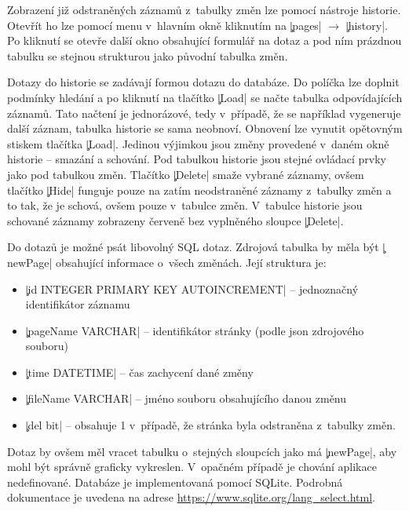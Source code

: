 Zobrazení již odstraněných záznamů z~tabulky změn lze pomocí nástroje historie.
Otevřít ho lze pomocí menu v~hlavním okně kliknutím na \c|pages| $\rightarrow$ \c|history|.
Po kliknutí se otevře další okno obsahující formulář na dotaz a pod ním prázdnou tabulku se stejnou strukturou jako původní tabulka změn.

Dotazy do historie se zadávají formou dotazu do databáze. 
Do políčka lze doplnit podmínky hledání a po kliknutí na tlačítko \c|Load| se načte tabulka odpovídajících záznamů. 
Tato načtení je jednorázové, tedy v~případě, že se například vygeneruje další záznam, tabulka historie se sama neobnoví.
Obnovení lze vynutit opětovným stiskem tlačítka \c|Load|.
Jedinou výjimkou jsou změny provedené v~daném okně historie -- smazání a schování.
Pod tabulkou historie jsou stejné ovládací prvky jako pod tabulkou změn.
Tlačítko \c|Delete| smaže vybrané záznamy, ovšem tlačítko \c|Hide| funguje pouze na zatím neodstraněné záznamy z~tabulky změn a to tak, že je schová, ovšem pouze v~tabulce změn.
V~tabulce historie jsou schované záznamy zobrazeny červeně bez vyplněného sloupce \c|Delete|.

Do dotazů je možné psát libovolný SQL dotaz.
Zdrojová tabulka by měla být \c|newPage| obsahující informace o~všech změnách. Její struktura je:
\begin{itemize}
	\item \c|id INTEGER PRIMARY KEY AUTOINCREMENT| -- jednoznačný identifikátor záznamu
	\item \c|pageName VARCHAR| -- identifikátor stránky (podle json zdrojového souboru)
	\item \c|time DATETIME| -- čas zachycení dané změny
	\item \c|fileName VARCHAR| -- jméno souboru obsahujícího danou změnu
	\item \c|del bit| -- obsahuje 1 v~případě, že stránka byla odstraněna z~tabulky změn.
\end{itemize}
Dotaz by ovšem měl vracet tabulku o~stejných sloupcích jako má \c|newPage|, aby mohl být správně graficky vykreslen.
V~opačném případě je chování aplikace nedefinované.
Databáze je implementovaná pomocí SQLite.
Podrobná dokumentace je uvedena na adrese \url{https://www.sqlite.org/lang_select.html}.
